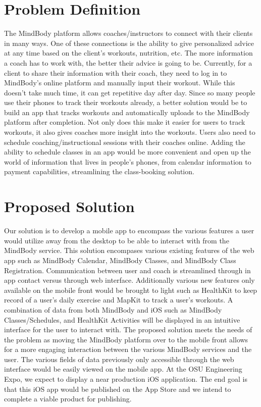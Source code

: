 \documentclass[letterpaper,10pt,titlepage]{article}
\begin{document}
\newpage

\section{Problem Definition}

The MindBody platform allows coaches/instructors to connect with their clients in many ways. One of these connections is the ability to give personalized advice at any time based on the client's workouts, nutrition, etc. The more information a coach has to work with, the better their advice is going to be. Currently, for a client to share their information with their coach, they need to log in to MindBody's online platform and manually input their workout. While this doesn't take much time, it can get repetitive day after day. Since so many people use their phones to track their workouts already, a better solution would be to build an app that tracks workouts and automatically uploads to the MindBody platform after completion. Not only does this make it easier for users to track workouts, it also gives coaches more insight into the workouts. Users also need to schedule coaching/instructional sessions with their coaches online. Adding the ability to schedule classes in an app would be more convenient and open up the world of information that lives in people's phones, from calendar information to payment capabilities, streamlining the class-booking solution.

\section{Proposed Solution}

Our solution is to develop a mobile app to encompass the various features a user would utilize away from the desktop to be able to interact with from the MindBody service. This solution encompases various existing features of the web app such as MindBody Calendar, MindBody Classes, and MindBody Class Registration. Communication between user and coach is streamlined through in app contact versus through web interface. Additionally various new features only available on the mobile front would be brought to light such as HealthKit to keep record of a user's daily exercise and MapKit to track a user's workouts. A combination of data from both MindBody and iOS such as MindBody Classes/Schedules, and HealthKit Activities will be displayed in an intuitive interface for the user to interact with. The proposed solution meets the needs of the problem as moving the MindBody platform over to the mobile front allows for a more engaging interaction between the various MindBody services and the user. The various fields of data previously only accessible through the web interface would be easily viewed on the mobile app. At the OSU Engineering Expo, we expect to display a near production iOS application. The end goal is that this iOS app would be published on the App Store and we intend to complete a viable product for publishing.
\end{document}
